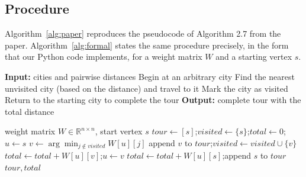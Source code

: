\documentclass[11pt,a4paper]{article}
\begin{document}
\subsection{Procedure}
Algorithm~\ref{alg:paper} reproduces the pseudocode of Algorithm 2.7 from the paper. Algorithm~\ref{alg:formal} states the same procedure precisely, in the form that our Python code implements, for a weight matrix $W$ and a starting vertex $s$.

\begin{algorithm}[H]
\caption{Algorithm 2.7 -- Greedy Algorithm Approach for TSP (Luna-Garcia et al., 2024, p.~89)}\label{alg:paper}
\begin{algorithmic}[1]
\State \textbf{Input:} cities and pairwise distances
\State Begin at an arbitrary city
  \State Find the nearest unvisited city (based on the distance) and travel to it
  \State Mark the city as visited
\EndWhile
\State Return to the starting city to complete the tour
\State \textbf{Output:} complete tour with the total distance
\end{algorithmic}
\end{algorithm}

\begin{algorithm}[H]
\caption{Greedy TSP, formal version (as implemented in \texttt{greedy\_tsp})}\label{alg:formal}
\begin{algorithmic}[1]
\Require weight matrix $W \in \mathbb{R}^{n \times n}$, start vertex $s$
\State $\mathit{tour} \gets [s]$;\quad $\mathit{visited} \gets \{s\}$;\quad $\mathit{total} \gets 0$;\quad $u \gets s$
  \State $v \gets \arg\min_{j \notin \mathit{visited}} W[u][j]$ 
  \State append $v$ to $\mathit{tour}$;\quad $\mathit{visited} \gets \mathit{visited} \cup \{v\}$
  \State $\mathit{total} \gets \mathit{total} + W[u][v]$;\quad $u \gets v$
\EndWhile
\State $\mathit{total} \gets \mathit{total} + W[u][s]$;\quad append $s$ to $\mathit{tour}$ 
\State \Return $\mathit{tour}, \mathit{total}$
\end{algorithmic}
\end{algorithm}
\end{document}
